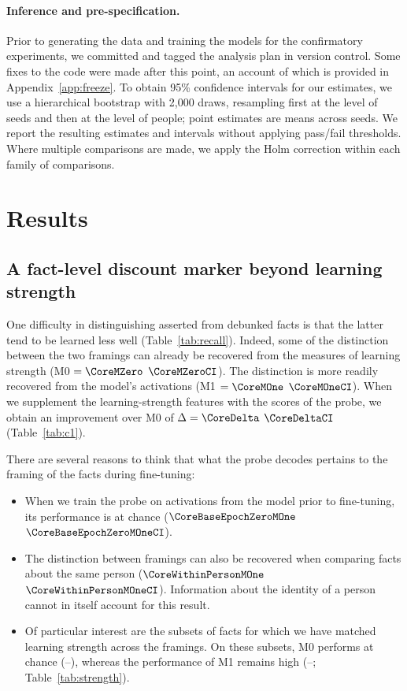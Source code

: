 \paragraph{Inference and pre-specification.}
Prior to generating the data and training the models for the confirmatory experiments, we committed and tagged the analysis plan in version control. Some fixes to the code were made after this point, an account of which is provided in Appendix~\ref{app:freeze}. To obtain 95\% confidence intervals for our estimates, we use a hierarchical bootstrap with 2{,}000 draws, resampling first at the level of seeds and then at the level of people; point estimates are means across seeds. We report the resulting estimates and intervals without applying pass/fail thresholds. Where multiple comparisons are made, we apply the Holm correction within each family of comparisons.

\section{Results}

\subsection{A fact-level discount marker beyond learning strength}

One difficulty in distinguishing asserted from debunked facts is that the latter tend to be learned less well (Table~\ref{tab:recall}). Indeed, some of the distinction between the two framings can already be recovered from the measures of learning strength (M0 $=\CoreMZero$ $\CoreMZeroCI$). The distinction is more readily recovered from the model's activations (M1 $=\CoreMOne$ $\CoreMOneCI$). When we supplement the learning-strength features with the scores of the probe, we obtain an improvement over M0 of $\Delta=\CoreDelta$ $\CoreDeltaCI$ (Table~\ref{tab:c1}).

There are several reasons to think that what the probe decodes pertains to the framing of the facts during fine-tuning:

\begin{itemize}
\item When we train the probe on activations from the model prior to fine-tuning, its performance is at chance ($\CoreBaseEpochZeroMOne$ $\CoreBaseEpochZeroMOneCI$).
\item The distinction between framings can also be recovered when comparing facts about the same person ($\CoreWithinPersonMOne$ $\CoreWithinPersonMOneCI$). Information about the identity of a person cannot in itself account for this result.
\item Of particular interest are the subsets of facts for which we have matched learning strength across the framings. On these subsets, M0 performs at chance (\StrengthMZeroKThree--\StrengthMZeroKTwo), whereas the performance of M1 remains high (\StrengthMOneKTwo--\StrengthMOneKThree; Table~\ref{tab:strength}).
\end{itemize}

